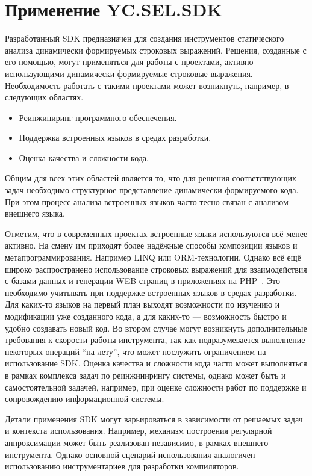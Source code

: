 \section{Применение YC.SEL.SDK}

Разработанный SDK предназначен для создания инструментов статического анализа динамически формируемых строковых выражений. Решения, созданные с его помощью, могут применяться для работы с проектами, активно использующими динамически формируемые строковые выражения. Необходимость работать с такими проектами может возникнуть, например, в следующих областях.

\begin{itemize}
    \item Реинжиниринг программного обеспечения.
    \item Поддержка встроенных языков в средах разработки.
    \item Оценка качества и сложности кода.
\end{itemize}

Общим для всех этих областей является то, что для решения соответствующих задач необходимо структурное представление динамически формируемого кода. При этом процесс анализа встроенных языков часто тесно связан с анализом внешнего языка.

Отметим, что в современных проектах встроенные языки используются всё менее активно. На смену им приходят более надёжные способы композиции языков и метапрограммирования. Например LINQ или ORM-технологии. Однако всё ещё широко распространено использование строковых выражений для взаимодействия с базами данных и генерации WEB-страниц в приложениях на PHP~\cite{DSQLInActiveUse}. Это необходимо учитывать при поддержке встроенных языков в средах разработки. Для каких-то языков на первый план выходят возможности по изучению и модификации уже созданного кода, а для каких-то --- возможность быстро и удобно создавать новый код. Во втором случае могут возникнуть дополнительные требования к скорости работы инструмента, так как подразумевается выполнение некоторых операций ``на лету'', что может послужить ограничением на использование SDK. Оценка качества и сложности  кода часто может выполняться в рамках комплекса задач по реинжинирингу системы, однако может быть и самостоятельной задачей, например, при оценке сложности работ по поддержке и сопровождению информационной системы.

Детали применения SDK могут варьироваться в зависимости от решаемых задач и контекста использования. Например, механизм построения регулярной аппроксимации может быть реализован независимо, в рамках внешнего инструмента. Однако основной сценарий использования аналогичен использованию инструментариев для разработки компиляторов.

